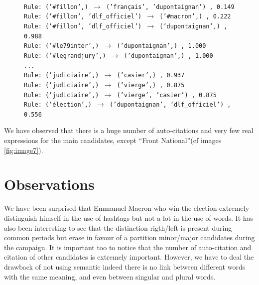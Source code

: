 \documentclass[a4paper]{article}
\theoremstyle{definition}
\begin{document}
\begin{figure}
\begingroup
\fontsize{9pt}{12pt}
\texttt{\\
Rule: ('\#fillon',) $\to$ ('français', 'dupontaignan') , 0.149\\
Rule: ('\#fillon', 'dlf\_officiel') $\to$ ('\#macron',) , 0.222\\
Rule: ('\#fillon', 'dlf\_officiel') $\to$ ('dupontaignan',) , 0.988\\
Rule: ('\#le79inter',) $\to$ ('dupontaignan',) , 1.000\\
Rule: ('\#legrandjury',) $\to$ ('dupontaignan',) , 1.000\\
...\\
Rule: ('judiciaire',) $\to$ ('casier',) , 0.937\\
Rule: ('judiciaire',) $\to$ ('vierge',) , 0.875\\
Rule: ('judiciaire',) $\to$ ('vierge', 'casier') , 0.875\\
Rule: ('élection',) $\to$ ('dupontaignan', 'dlf\_officiel') , 0.556\\
}
\endgroup
{}
\end{figure}

We have observed that there is a huge number of auto-citations and very few real expressions for the main candidates, except ``Front National''(cf images \ref{fig:image7}).

\section{Observations}
We have been surprised that Emmanuel Macron who win the election extremely distinguish himself in the use of hashtags but not a lot in the use of words.
It has also been interesting to see that the distinction rigth/left is present during common periods but erase in favour of a partition minor/major candidates during the campaign.
It is important too to notice that the number of auto-citation and citation of other candidates is extremely important.
However, we have to deal the drawback of not using semantic indeed there is no link between different words with the same meaning, and even between singular and plural words.
\end{document}
